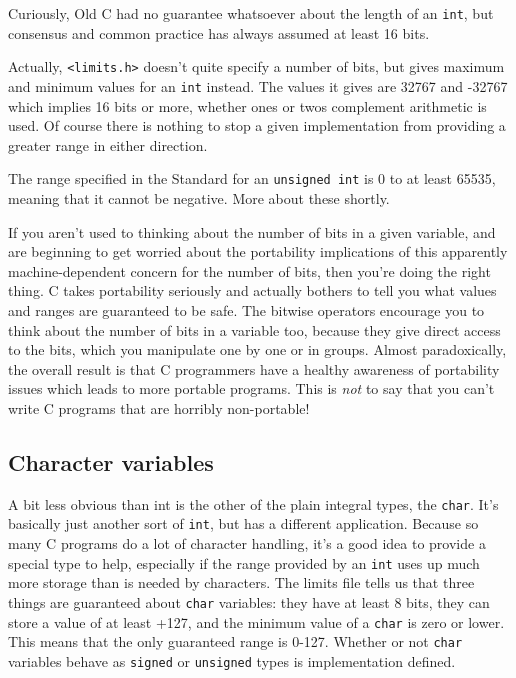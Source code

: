    Curiously, Old C had no guarantee whatsoever about the length of an
    \texttt{int}, but consensus and common practice has always assumed at
    least 16 bits.


   Actually, \texttt{<limits.h>} doesn't quite specify a number
    of bits, but gives maximum and minimum values for an \texttt{int}
    instead. The values it gives are 32767 and -32767 which implies
    16 bits or more, whether ones or twos complement arithmetic is used.
    Of course there is nothing to stop a given implementation from providing a
    greater range in either direction.


   The range specified in the Standard for an \texttt{unsigned int} is
    0 to at least 65535, meaning that it cannot be negative. More about
    these shortly.


   If you aren't used to thinking about the number of bits in a given
    variable, and are beginning to get worried about the portability
    implications of this apparently machine-dependent concern for the number
    of bits, then you're doing the right thing. C takes portability
    seriously and actually bothers to tell you what values and ranges are
    guaranteed to be safe. The bitwise operators encourage you to think about
    the number of bits in a variable too, because they give direct access to
    the bits, which you manipulate one by one or in groups. Almost
    paradoxically, the overall result is that C programmers have a
    healthy awareness of portability issues which leads to more portable
    programs. This is \textit{not} to say that you can't write C programs
    that are horribly non-portable!


  

  \subsection{Character variables}
   

   A bit less obvious than int is the other of the plain integral types,
    the \texttt{char}. It's basically just another sort of
    \texttt{int}, but has a different application. Because so many
    C programs do a lot of character handling, it's a good idea to
    provide a special type to help, especially if the range provided by an
    \texttt{int} uses up much more storage than is needed by characters.
    The limits file tells us that three things are guaranteed about
    \texttt{char} variables: they have at least 8 bits, they can store a
    value of at least +127, and the minimum value of a \texttt{char}
    is zero or lower. This means that the only guaranteed range
    is 0-127. Whether or not \texttt{char} variables behave as
    \texttt{signed} or \texttt{unsigned} types is implementation
    defined.


